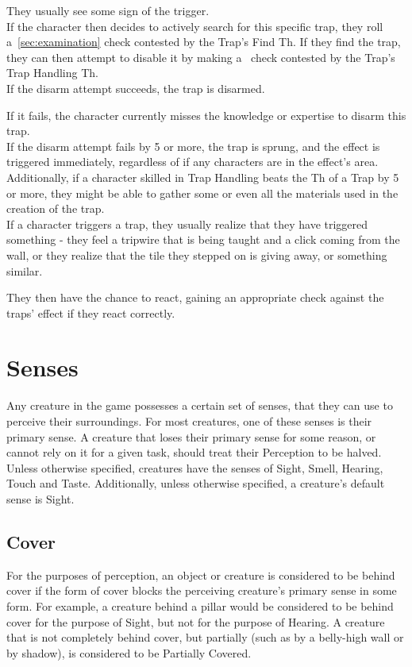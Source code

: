 They usually see some sign of the trigger.\\
If the character then decides to actively search for this specific trap, they roll a~\ref{sec:examination} check contested by the Trap's Find Th.
If they find the trap, they can then attempt to disable it by making a~ check contested by the Trap's Trap Handling Th.\\
If the disarm attempt succeeds, the trap is disarmed.

If it fails, the character currently misses the knowledge or expertise to disarm this trap.\\
If the disarm attempt fails by 5 or more, the trap is sprung, and the effect is triggered immediately, regardless of if any characters are in the effect's area.\\
Additionally, if a character skilled in Trap Handling beats the Th of a Trap by 5 or more, they might be able to gather some or even all the materials used in the creation of the trap.\\
If a character triggers a trap, they usually realize that they have triggered something - they feel a tripwire that is being taught and a click coming from the wall, or they realize that the tile they stepped on is giving away, or something similar.

They then have the chance to react, gaining an appropriate check against the traps' effect if they react correctly.\\

\section{Senses}\label{sec:senses}
Any creature in the game possesses a certain set of senses, that they can use to perceive their surroundings.
For most creatures, one of these senses is their primary sense.
A creature that loses their primary sense for some reason, or cannot rely on it for a given task, should treat their Perception to be halved.
Unless otherwise specified, creatures have the senses of Sight, Smell, Hearing, Touch and Taste.
Additionally, unless otherwise specified, a creature's default sense is Sight.

\subsection{Cover}\label{subsec:cover}
For the purposes of perception, an object or creature is considered to be behind cover if the form of cover blocks the perceiving creature's primary sense in some form.
For example, a creature behind a pillar would be considered to be behind cover for the purpose of Sight, but not for the purpose of Hearing.
A creature that is not completely behind cover, but partially (such as by a belly-high wall or by shadow), is considered to be Partially Covered.

